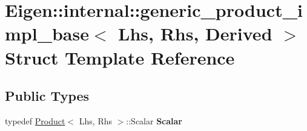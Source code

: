 \hypertarget{struct_eigen_1_1internal_1_1generic__product__impl__base}{}\section{Eigen\+::internal\+::generic\+\_\+product\+\_\+impl\+\_\+base$<$ Lhs, Rhs, Derived $>$ Struct Template Reference}
\label{struct_eigen_1_1internal_1_1generic__product__impl__base}
\subsection*{Public Types}
\begin{DoxyCompactItemize}
\item 
\mbox{\label{struct_eigen_1_1internal_1_1generic__product__impl__base_a5cc388e261b40abd169f954f94e4cc01}} 
typedef \mbox{\hyperlink{class_eigen_1_1_product}{Product}}$<$ Lhs, Rhs $>$\+::Scalar {\bfseries Scalar}
\end{DoxyCompactItemize}

